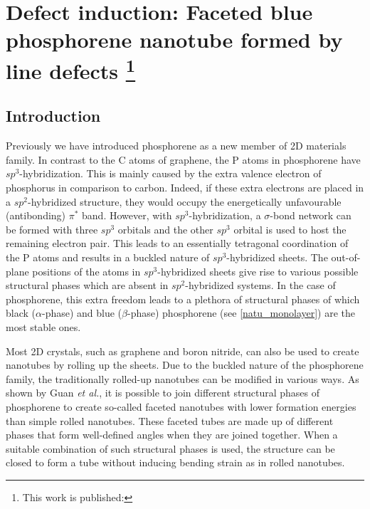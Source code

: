 \section[Defect induction: Faceted blue phosphorene nanotube formed by line defects]{Defect induction: Faceted blue phosphorene nanotube formed by line defects \footnote{This work is published:\cite{Aierken2015.nanotubes}} \label{defect_phos}}

\subsection{Introduction}

Previously we have introduced phosphorene as a new member of 2D materials family. In contrast to the C atoms of graphene, the P atoms in phosphorene have $sp^3$-hybridization. This is mainly caused by the extra valence electron of phosphorus in comparison to carbon. Indeed, if these extra electrons are placed in a $sp^2$-hybridized structure, they would occupy the energetically unfavourable (antibonding) $\pi^*$ band. However, with $sp^3$-hybridization, a $\sigma$-bond network can be formed with three $sp^3$ orbitals and the other $sp^3$ orbital is used to host the remaining electron pair. This leads to an essentially tetragonal coordination of the P atoms and results in a buckled nature of $sp^3$-hybridized sheets. The out-of-plane positions of the atoms in $sp^3$-hybridized sheets give rise to various possible structural phases which are absent in $sp^2$-hybridized systems. In the case of phosphorene, this extra freedom leads to a plethora of structural phases\cite{Guan2014a,Wu2015} of which black ($\alpha$-phase) and blue ($\beta$-phase) phosphorene (see \autoref{natu_monolayer}) are the most stable ones.  

Most 2D crystals, such as graphene and boron nitride, can also be used to create nanotubes by rolling up the sheets. Due to the buckled nature of the phosphorene family, the traditionally rolled-up nanotubes can be modified in various ways. As shown by Guan \textit{et al.}\cite{Guan2014a}, it is possible to join different structural phases of phosphorene to create so-called faceted nanotubes with lower formation energies than simple rolled nanotubes. These faceted tubes are made up of different phases that form well-defined angles when they are joined together.  When a suitable combination of such structural phases is used, the structure can be closed to form a tube without inducing bending strain as in rolled nanotubes.

